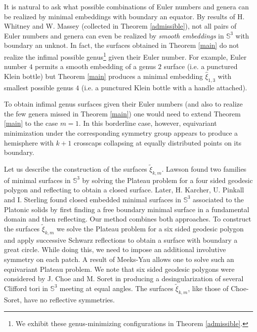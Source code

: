 \documentclass[11pt, reqno]{amsart}
\numberwithin{equation}{section}
\begin{document}
It is natural to ask what possible combinations of Euler numbers and genera can be realized by minimal embeddings with boundary an equator.  By results of H. Whitney \cite{Whitney} and W. Massey \cite{Ma} (collected in Theorem \ref{admissible}), not all pairs of Euler numbers and genera can even be realized by \emph{smooth embeddings} in $\mathbb{S}^3$ with boundary an unknot.  In fact, the surfaces obtained in Theorem \ref{main} do not realize the infimal possible genus\footnote{We exhibit these genus-minimizing configurations in Theorem \ref{admissible}.} given their Euler number. For example, Euler number $4$ permits a smooth embedding of a genus $2$ surface (i.e. a punctured Klein bottle) but Theorem \ref{main} produces a minimal embedding $\hat{\xi}_{1,3}$ with smallest possible genus $4$ (i.e. a punctured Klein bottle with a handle attached). 

To obtain infimal genus surfaces given their Euler numbers (and also to realize the few genera missed in Theorem \ref{main}) one would need to extend Theorem \ref{main} to the case $m=1$.  In this borderline case, however, equivariant minimization under the corresponding symmetry group appears to produce a hemisphere with $k+1$ crosscaps collapsing at equally distributed points on its boundary.

Let us describe the construction of the surfaces $\tilde{\xi}_{k,m}$. Lawson \cite{LS} found two families of minimal surfaces in $\mathbb{S}^3$ by solving the Plateau problem for a four sided geodesic polygon and reflecting to obtain a closed surface.   Later, H. Karcher, U. Pinkall and I. Sterling \cite{KPS} found closed embedded minimal surfaces in $\mathbb{S}^3$ associated to the Platonic solids by first finding a free boundary minimal surface in a fundamental domain and then reflecting.  Our method combines both approaches. To construct the surfaces $\tilde{\xi}_{k,m}$ we solve the Plateau problem for a six sided geodesic polygon and apply successive Schwarz reflections to obtain a surface with boundary a great circle. While doing this, we need to impose an additional involutive symmetry on each patch.  A result of Meeks-Yau \cite{MYD} allows one to solve such an equivariant Plateau problem.  We note that six sided geodesic polygons were considered by J. Choe and M. Soret \cite{CS2} in producing a desingularization of several Clifford tori in $\mathbb{S}^3$ meeting at equal angles.  The surfaces $\tilde{\xi}_{k,m}$, like those of Choe-Soret, have no reflective symmetries.
\end{document}
